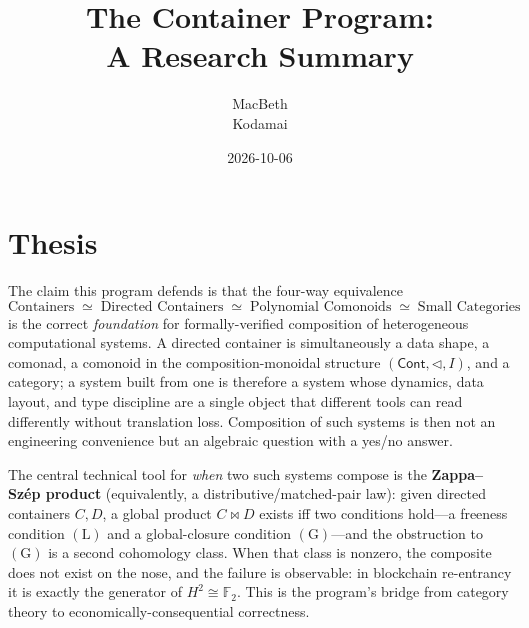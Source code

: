 \documentclass[11pt]{article}
\title{\textbf{The Container Program:\\ A Research Summary}}
\author{MacBeth \\ \small Kodamai}
\date{2026-10-06}
\theoremstyle{definition}
\newcommand{\Cont}{\mathsf{Cont}}
\begin{document}
\maketitle

\begin{center}
\end{center}

\bigskip

\section{Thesis}

The claim this program defends is that the four-way equivalence
\[
  \text{Containers} \;\simeq\; \text{Directed Containers} \;\simeq\;
  \text{Polynomial Comonoids} \;\simeq\; \text{Small Categories}
\]
is the correct \emph{foundation} for formally-verified composition of heterogeneous
computational systems. A directed container is simultaneously a data shape, a comonad, a
comonoid in the composition-monoidal structure $(\Cont,\lhd,I)$, and a category; a system
built from one is therefore a system whose dynamics, data layout, and type discipline are a
single object that different tools can read differently without translation loss. Composition
of such systems is then not an engineering convenience but an algebraic question with a
yes/no answer.

The central technical tool for \emph{when} two such systems compose is the
\textbf{Zappa--Szép product} (equivalently, a distributive/matched-pair law): given directed
containers $C,D$, a global product $C \bowtie D$ exists iff two conditions hold---a freeness
condition $(\mathrm{L})$ and a global-closure condition $(\mathrm{G})$---and the obstruction to
$(\mathrm{G})$ is a second cohomology class. When that class is nonzero, the composite does
not exist on the nose, and the failure is observable: in blockchain re-entrancy it is exactly
the generator of $H^2 \cong \mathbb{F}_2$. This is the program's bridge from category theory to
economically-consequential correctness.
\end{document}
